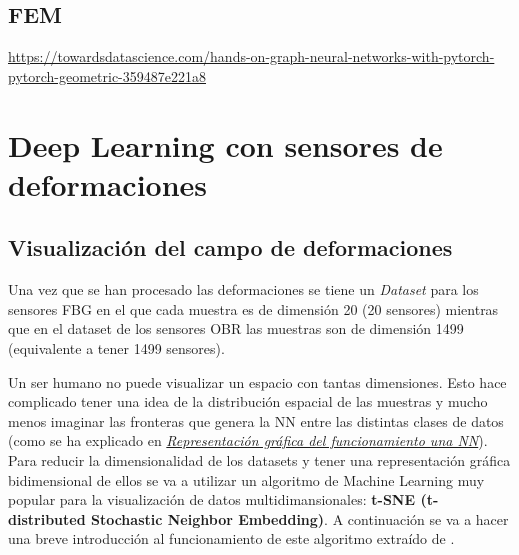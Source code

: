     
    
\subsection{FEM}
    
    
    

\url{https://towardsdatascience.com/hands-on-graph-neural-networks-with-pytorch-pytorch-geometric-359487e221a8}



\clearpage

\section{Deep Learning con sensores de deformaciones}

\subsection{Visualización del campo de deformaciones}

Una vez que se han procesado las deformaciones se tiene un \textit{Dataset} para los sensores FBG en el que cada muestra es de dimensión 20 (20 sensores) mientras que en el dataset de los sensores OBR las muestras son de dimensión 1499 (equivalente a tener 1499 sensores).

Un ser humano no puede visualizar un espacio con tantas dimensiones. Esto hace complicado tener una idea de la distribución espacial de las muestras y mucho menos imaginar las fronteras que genera la NN entre las distintas clases de datos (como se ha explicado en \hyperref[sec:funcionamiento_DL]{\textit{Representación gráfica del funcionamiento una NN}}).\\

Para reducir la dimensionalidad de los datasets y tener una representación gráfica bidimensional de ellos se va a utilizar un algoritmo de Machine Learning muy popular para la visualización de datos multidimansionales: \textbf{t-SNE (t-distributed Stochastic Neighbor Embedding)}. A continuación se va a hacer una breve introducción al funcionamiento de este algoritmo extraído de \cite{t_sne}.\\

